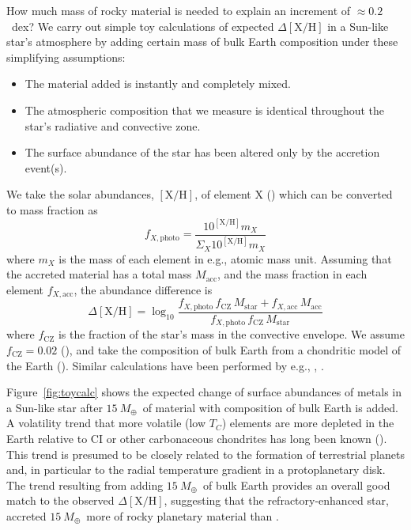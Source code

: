 \documentclass[modern, letterpaper]{aastex61}
\newcommand*\elem[1]{\ensuremath{\mathrm{#1}}}
\newcommand*\elemH[1]{\ensuremath{[\mathrm{#1}/\elem{H}]}}
\newcommand{\sunanalog}{\text{Krios}}
\newcommand{\bizarreone}{\text{Kronos}}
\newcommand{\Tcondens}{\ensuremath{T_C}}
\newcommand{\mearth}{\ensuremath{M_\oplus}}
\newcommand{\maccreted}{\ensuremath{15~\mearth}}
\begin{document}
How much mass of rocky material is needed to explain an increment of
$\approx 0.2$~dex?
We carry out simple toy calculations of expected $\Delta\elemH{X}$
in a Sun-like star's atmosphere by adding certain mass of bulk Earth composition
under these simplifying assumptions:
\begin{itemize}
  \item The material added is instantly and completely mixed.
  \item The atmospheric composition that we measure is identical throughout
    the star's radiative and convective zone.
  \item The surface abundance of the star has been altered only by the
    accretion event(s).
\end{itemize}

We take the solar abundances, $\elemH{X}$, of element \elem{X}
(\citealt{Asplund:2009aa}) which can be converted to mass fraction as
\begin{equation}
  f_{X,\mathrm{photo}} = \frac{10^{\elemH{X}} m_X}{\Sigma_X 10^{\elemH{X}} m_X}
\end{equation}
where $m_X$ is the mass of each element in e.g., atomic mass unit.
Assuming that the accreted material has a total mass $M_\mathrm{acc}$, and the
mass fraction in each element $f_{X,\mathrm{acc}}$,
the abundance difference is
\begin{equation}
  \Delta\elemH{X} = \log_{10} \frac{f_{X,\mathrm{photo}}\,f_\mathrm{CZ}\,M_\mathrm{star}
    + f_{X,\mathrm{acc}}\,M_\mathrm{acc}}
    {f_{X,\mathrm{photo}}\,f_\mathrm{CZ}\,M_\mathrm{star}}
\end{equation}
where $f_\mathrm{CZ}$ is the fraction of the star's mass in the convective envelope.
We assume $f_\mathrm{CZ} = 0.02$ (\citealt{2013ApJ...776...87S}),
and take the composition of bulk Earth from a chondritic model of the Earth
(\citealt{2003TrGeo...2..547M}).
Similar calculations have been performed by e.g., \citet{Chambers:2010aa},
\citet{Mack:2014aa,Mack:2016aa}.

Figure~\ref{fig:toycalc} shows the expected change of surface abundances of
metals in a Sun-like star after \maccreted\ of material with composition of
bulk Earth is added.
A volatility trend that more volatile (low \Tcondens) elements are more
depleted in the Earth relative to CI or other carbonaceous chondrites
has long been known (\citealt{mcdonough2001composition}).
This trend is presumed to be closely related to the formation of terrestrial
planets and, in particular to the radial temperature gradient in a
protoplanetary disk.
The trend resulting from adding \maccreted\ of bulk Earth
provides an overall good match to the observed $\Delta\elemH{X}$,
suggesting that the refractory-enhanced star, \bizarreone\,
accreted \maccreted\ more of rocky planetary material than \sunanalog.
\end{document}
